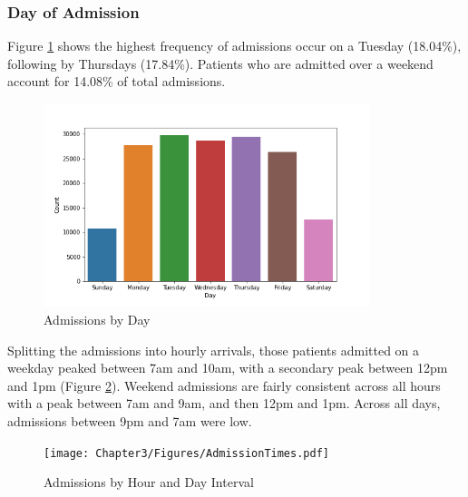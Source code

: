 \documentclass[../thesis.tex]{subfiles}
\begin{document}
\subsubsection{Day of Admission} 
Figure \ref{Fig:AdmissionDay} shows the highest frequency of admissions occur on a Tuesday (18.04\%), following by Thursdays (17.84\%). Patients who are admitted over a weekend account for 14.08\% of total admissions.
\begin{figure}[H]
    \centering
    \includegraphics[width = 9.5cm]{Chapter3/Figures/Day.png}
    \caption{Admissions by Day}
    \label{Fig:AdmissionDay}
\end{figure}
Splitting the admissions into hourly arrivals, those patients admitted on a weekday peaked  between 7am and 10am, with a secondary peak between 12pm and 1pm (Figure \ref{Fig:AdmissionTimes}). Weekend admissions are fairly consistent across all hours with a peak between 7am and 9am, and then 12pm and 1pm. Across all days, admissions between 9pm and 7am were low.
\begin{figure}[H]
    \centering
    \texttt{[image: Chapter3/Figures/AdmissionTimes.pdf]}
    \caption{Admissions by Hour and Day Interval}
    \label{Fig:AdmissionTimes}
\end{figure}
\end{document}
